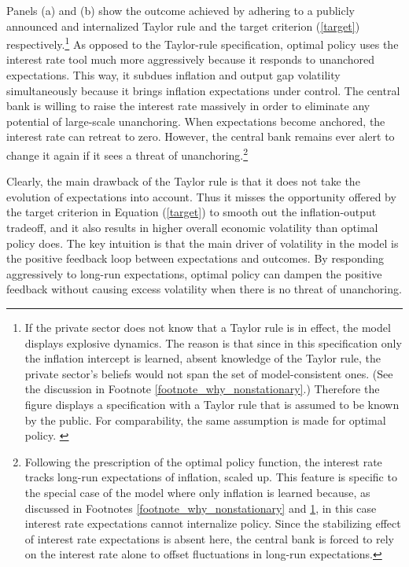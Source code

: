 \documentclass[11pt]{article}
\renewcommand{\[}{\begin{equation}}
\renewcommand{\]}{\end{equation}}
\begin{document}
Panels (a) and (b) show the outcome achieved by adhering to a publicly announced and internalized Taylor rule and the target criterion (\ref{target}) respectively.\footnote{If the private sector does not know that a Taylor rule is in effect, the model displays explosive dynamics. The reason is that since in this specification only the inflation intercept is learned, absent knowledge of the Taylor rule, the private sector's beliefs would not span the set of model-consistent ones. (See the discussion in Footnote \ref{footnote_why_nonstationary}.) Therefore the figure displays a specification with a Taylor rule that is assumed to be known by the public. For comparability, the same assumption is made for optimal policy. %
\label{footnote_i_expectations} }
As opposed to the Taylor-rule specification, optimal policy uses the interest rate tool much more aggressively because it responds to unanchored expectations. This way, it subdues inflation and output gap volatility simultaneously because it brings inflation expectations under control. The central bank is willing to raise the interest rate massively in order to eliminate any potential of large-scale unanchoring. When expectations become anchored, the interest rate can retreat to zero. However, the central bank remains ever alert to change it again if it sees a threat of unanchoring.\footnote{Following the prescription of the optimal policy function, the interest rate tracks long-run expectations of inflation, scaled up. This feature is specific to the special case of the model where only inflation is learned because, as discussed in Footnotes \ref{footnote_why_nonstationary} and \ref{footnote_i_expectations}, in this case interest rate expectations cannot internalize policy. Since the stabilizing effect of interest rate expectations is absent here, the central bank is forced to rely on the interest rate alone to offset fluctuations in long-run expectations.}

Clearly, the main drawback of the Taylor rule is that it does not take the evolution of expectations into account. Thus it misses the opportunity offered by the target criterion in Equation (\ref{target}) to smooth out the inflation-output tradeoff, and it also results in higher overall economic volatility than optimal policy does. The key intuition is that the main driver of volatility in the model is the positive feedback loop between expectations and outcomes. By responding aggressively to long-run expectations, optimal policy can dampen the positive feedback without causing excess volatility when there is no threat of unanchoring. 
\end{document}
